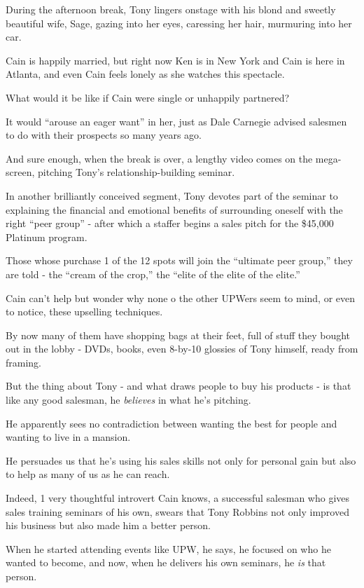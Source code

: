 \documentclass[oneside]{article}
\numberwithin{equation}{section}
\begin{document}
%
During the afternoon break, Tony lingers onstage with his blond and sweetly beautiful wife, Sage, gazing into her eyes, caressing her hair, murmuring into her car.

Cain is happily married, but right now Ken is in New York and Cain is here in Atlanta, and even Cain feels lonely as she watches this spectacle.

What would it be like if Cain were single or unhappily partnered?

It would ``arouse an eager want'' in her, just as Dale Carnegie advised salesmen to do with their prospects so many years ago.

And sure enough, when the break is over, a lengthy video comes on the mega-screen, pitching Tony's relationship-building seminar.

%
In another brilliantly conceived segment, Tony devotes part of the seminar to explaining the financial and emotional benefits of surrounding oneself with the right ``peer group'' - after which a staffer begins a sales pitch for the \$45,000 Platinum program.

Those whose purchase 1 of the 12 spots will join the ``ultimate peer group,'' they are told - the ``cream of the crop,'' the ``elite of the elite of the elite.''

%
Cain can't help but wonder why none o the other UPWers seem to mind, or even to notice, these upselling techniques.

By now many of them have shopping bags at their feet, full of stuff they bought out in the lobby - DVDs, books, even 8-by-10 glossies of Tony himself, ready from framing.

%
But the thing about Tony - and what draws people to buy his products - is that like any good salesman, he \textit{believes} in what he's pitching.

He apparently sees no contradiction between wanting the best for people and wanting to live in a mansion.

He persuades us that he's using his sales skills not only for personal gain but also to help as many of us as he can reach.

Indeed, 1 very thoughtful introvert Cain knows, a successful salesman who gives sales training seminars of his own, swears that Tony Robbins not only improved his business but also made him a better person.

When he started attending events like UPW, he says, he focused on who he wanted to become, and now, when he delivers his own seminars, he \textit{is} that person.
\end{document}

